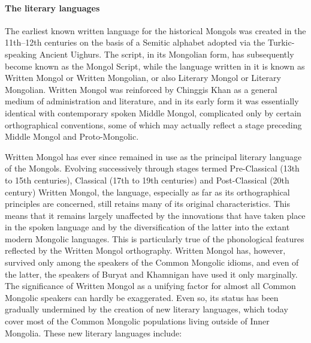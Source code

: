 \paragraph{The literary languages}
The earliest known written language for
the historical Mongols was created in the 11th–12th centuries on the basis of a Semitic
alphabet adopted via the Turkic-speaking Ancient Uighurs. The script, in its Mongolian
form, has subsequently become known as the Mongol Script, while the language written
in it is known as Written Mongol or Written Mongolian, or also Literary Mongol
or Literary Mongolian. Written Mongol was reinforced by Chinggis Khan as a general
medium of administration and literature, and in its early form it was essentially identical
with contemporary spoken Middle Mongol, complicated only by certain orthographical
conventions, some of which may actually reflect a stage preceding Middle Mongol and
Proto-Mongolic.

Written Mongol has ever since remained in use as the principal literary language of
the Mongols. Evolving successively through stages termed Pre-Classical (13th to 15th
centuries), Classical (17th to 19th centuries) and Post-Classical (20th century) Written
Mongol, the language, especially as far as its orthographical principles are concerned, still
retains many of its original characteristics. This means that it remains largely unaffected
by the innovations that have taken place in the spoken language and by the diversification
of the latter into the extant modern Mongolic languages. This is particularly true of
the phonological features reflected by the Written Mongol orthography. Written Mongol
has, however, survived only among the speakers of the Common Mongolic idioms, and
even of the latter, the speakers of Buryat and Khamnigan have used it only marginally.
The significance of Written Mongol as a unifying factor for almost all Common
Mongolic speakers can hardly be exaggerated. Even so, its status has been gradually
undermined by the creation of new literary languages, which today cover most of the
Common Mongolic populations living outside of Inner Mongolia. These new literary
languages include:

